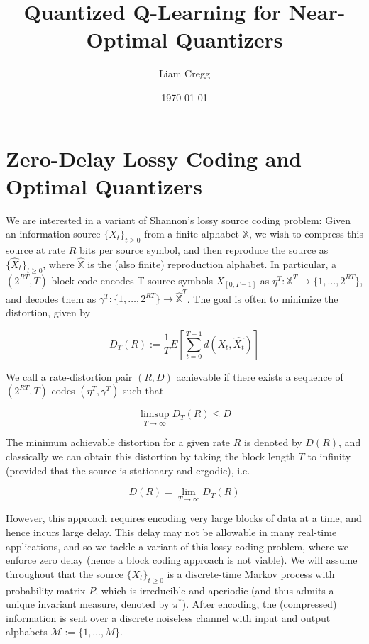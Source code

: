 \documentclass{article}
\title{Quantized Q-Learning for Near-Optimal Quantizers}
\date{\today}
\author{Liam Cregg}
\begin{document}
\begin{titlepage}
    \maketitle
\end{titlepage}

\newpage

\section{Zero-Delay Lossy Coding and Optimal Quantizers}\label{optimal quantizers}
We are interested in a variant of Shannon's lossy source coding problem: Given an information source \( \{X_t\}_{t\ge0} \) from a finite alphabet \( \mathbb{X} \), we wish to compress this source at rate \(R\) bits per source symbol, and then reproduce the source as \( \{\hat{X}_t\}_{t\ge0} \), where \(\hat{\mathbb{X}}\) is the (also finite) reproduction alphabet. In particular, a \((2^{RT},T)\) block code encodes T source symbols \(X_{[0,T-1]}\) as \(\eta^T : \mathbb{X}^T \to \{1,\ldots,2^{RT}\} \), and decodes them as \( \gamma^T : \{1,\ldots,2^{RT}\} \to \hat{\mathbb{X}}^T \). The goal is often to minimize the distortion, given by

\[ D_T(R) := \frac{1}{T} E[\sum_{t=0}^{T-1}d(X_t,\hat{X_t})]\]

We call a rate-distortion pair \((R,D)\) achievable if there exists a sequence of \((2^{RT},T)\) codes \((\eta^T,\gamma^T)\) such that

\[ \limsup_{T \to \infty}D_T(R) \le D\]

The minimum achievable distortion for a given rate \(R\) is denoted by \(D(R)\), and classically we can obtain this distortion by taking the block length \(T\) to infinity (provided that the source is stationary and ergodic), i.e.

\[D(R) = \lim_{T \to  \infty}D_T(R)\]

However, this approach requires encoding very large blocks of data at a time, and hence incurs large delay. This delay may not be allowable in many real-time applications, and so we tackle a variant of this lossy coding problem, where we enforce zero delay (hence a block coding approach is not viable). We will assume throughout that the source \( \{X_t\}_{t \ge 0} \) is a discrete-time Markov process with probability matrix \( P \), which is irreducible and aperiodic (and thus admits a unique invariant measure, denoted by \( \pi^* \)). After encoding, the (compressed) information is sent over a discrete noiseless channel with input and output alphabets \( \mathcal{M} := \{1,\ldots,M\} \).
\end{document}
